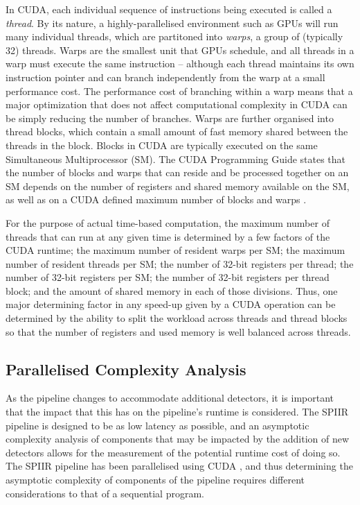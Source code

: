 \documentclass{article}
\begin{document}
In CUDA, each individual sequence of instructions being executed is called a \textit{thread}.
By its nature, a highly-parallelised environment such as GPUs will run many individual threads, which are partitoned into \textit{warps}, a group of (typically 32) threads.
Warps are the smallest unit that GPUs schedule, and all threads in a warp must execute the same instruction -- although each thread maintains its own instruction pointer and can branch independently from the warp at a small performance cost.
The performance cost of branching within a warp means that a major optimization that does not affect computational complexity in CUDA can be simply reducing the number of branches.
Warps are further organised into thread blocks, which contain a small amount of fast memory shared between the threads in the block.
Blocks in CUDA are typically executed on the same Simultaneous Multiprocessor (SM).
The CUDA Programming Guide states that the number of blocks and warps that can reside and be processed together on an SM depends on the number of registers and shared memory available on the SM, as well as on a CUDA defined maximum number of blocks and warps \cite{CUDA_Guide}.

For the purpose of actual time-based computation, the maximum number of threads that can run at any given time is determined by a few factors of the CUDA runtime; the maximum number of resident warps per SM; the maximum number of resident threads per SM; the number of 32-bit registers per thread; the number of 32-bit registers per SM; the number of 32-bit registers per thread block; and the amount of shared memory in each of those divisions.
Thus, one major determining factor in any speed-up given by a CUDA operation can be determined by the ability to split the workload across threads and thread blocks so that the number of registers and used memory is well balanced across threads.

\subsection{Parallelised Complexity Analysis} \label{sec:lit_review:par_comp_analysis}

As the pipeline changes to accommodate additional detectors, it is important that the impact that this has on the pipeline's runtime is considered.
The SPIIR pipeline is designed to be as low latency as possible, and an asymptotic complexity analysis of components that may be impacted by the addition of new detectors allows for the measurement of the potential runtime cost of doing so.
The SPIIR pipeline has been parallelised using CUDA \cite{SPIIRGPU2018}, and thus determining the asymptotic complexity of components of the pipeline requires different considerations to that of a sequential program.
\\
\end{document}
